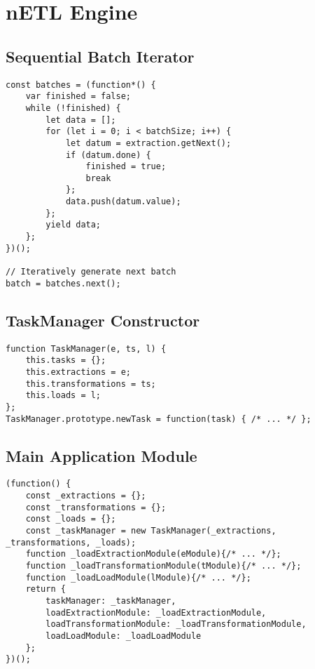 \section{nETL Engine}
\subsection{Sequential Batch Iterator}
\label{netl-batch-generator}
\begin{verbatim}
const batches = (function*() {
    var finished = false;
    while (!finished) {
        let data = [];
        for (let i = 0; i < batchSize; i++) {
            let datum = extraction.getNext();
            if (datum.done) {
                finished = true;
                break
            };
            data.push(datum.value);
        };
        yield data;
    };
})();

// Iteratively generate next batch
batch = batches.next();
\end{verbatim}

\subsection{TaskManager Constructor}
\label{netl-taskmanager-constructor}
\begin{verbatim}
function TaskManager(e, ts, l) {
    this.tasks = {};
    this.extractions = e;
    this.transformations = ts;
    this.loads = l;
};
TaskManager.prototype.newTask = function(task) { /* ... */ };
\end{verbatim}

\subsection{Main Application Module}
\label{netl-application-module}
\begin{verbatim}
(function() {
    const _extractions = {};
    const _transformations = {};
    const _loads = {};        
    const _taskManager = new TaskManager(_extractions, _transformations, _loads);
    function _loadExtractionModule(eModule){/* ... */};
    function _loadTransformationModule(tModule){/* ... */};
    function _loadLoadModule(lModule){/* ... */};
    return {
        taskManager: _taskManager,
        loadExtractionModule: _loadExtractionModule,
        loadTransformationModule: _loadTransformationModule,
        loadLoadModule: _loadLoadModule
    };
})();
\end{verbatim}

